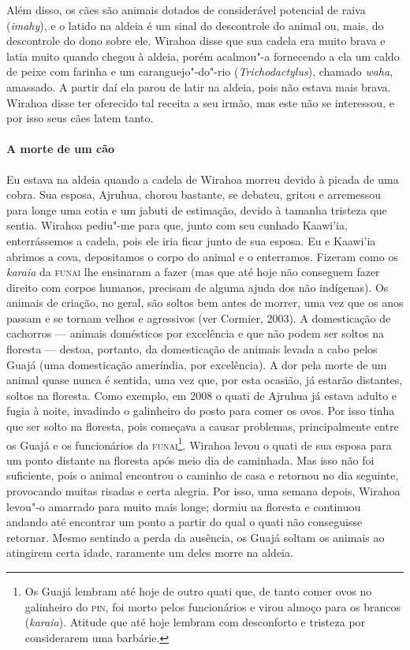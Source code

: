 Além disso, os cães são animais dotados de considerável potencial de
raiva (\emph{imahy}), e o latido na aldeia é um sinal do descontrole do
animal ou, mais, do descontrole do dono sobre ele. Wirahoa disse que sua
cadela era muito brava e latia muito quando chegou à aldeia, porém
acalmou"-a fornecendo a ela um caldo de peixe com farinha e um
caranguejo"-do"-rio (\emph{Trichodactylus}), chamado \emph{waha},
amassado. A partir daí ela parou de latir na aldeia, pois não estava
mais brava. Wirahoa disse ter oferecido tal receita a seu irmão, mas
este não se interessou, e por isso seus cães latem tanto.

\paragraph{A morte de um cão}

Eu estava na aldeia quando a cadela de Wirahoa morreu devido à picada de
uma cobra. Sua esposa, Ajruhua, chorou bastante, se debateu, gritou e
arremessou para longe uma cotia e um jabuti de estimação, devido à
tamanha tristeza que sentia. Wirahoa pediu"-me para que, junto com seu
cunhado Kaawi'ia, enterrássemos a cadela, pois ele iria ficar junto de
sua esposa. Eu e Kaawi'ia abrimos a cova, depositamos o corpo do animal
e o enterramos. Fizeram como os \emph{karaia} da \textsc{funai} lhe ensinaram a
fazer (mas que até hoje não conseguem fazer direito com corpos humanos,
precisam de alguma ajuda dos não indígenas). Os animais de criação, no
geral, são soltos bem antes de morrer, uma vez que os anos passam e se
tornam velhos e agressivos (ver Cormier, 2003). A domesticação de
cachorros --- animais domésticos por excelência e que não podem ser soltos
na floresta --- destoa, portanto, da domesticação de animais levada a cabo
pelos Guajá (uma domesticação ameríndia, por excelência). A dor pela
morte de um animal quase nunca é sentida, uma vez que, por esta ocasião,
já estarão distantes, soltos na floresta. Como exemplo, em 2008 o quati
de Ajruhua já estava adulto e fugia à noite, invadindo o galinheiro do
posto para comer os ovos. Por isso tinha que ser solto na floresta, pois
começava a causar problemas, principalmente entre os Guajá e os
funcionários da \textsc{funai}\footnote{Os Guajá lembram até hoje de outro quati
  que, de tanto comer ovos no galinheiro do \textsc{pin}, foi morto pelos
  funcionários e virou almoço para os brancos (\emph{karaia}). Atitude
  que até hoje lembram com desconforto e tristeza por considerarem uma
  barbárie.}. Wirahoa levou o quati de sua esposa para um ponto distante
na floresta após meio dia de caminhada. Mas isso não foi suficiente,
pois o animal encontrou o caminho de casa e retornou no dia seguinte,
provocando muitas risadas e certa alegria. Por isso, uma semana depois,
Wirahoa levou"-o amarrado para muito mais longe; dormiu na floresta e
continuou andando até encontrar um ponto a partir do qual o quati não
conseguisse retornar. Mesmo sentindo a perda da ausência, os Guajá
soltam os animais ao atingirem certa idade, raramente um deles morre na
aldeia.

